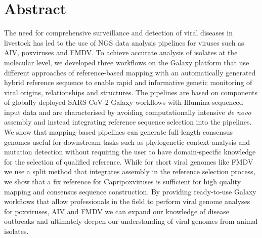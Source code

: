 \chapter*{Abstract}
The need for comprehensive surveillance and detection of viral diseases in livestock has led to the use of \ac{NGS} data analysis pipelines for viruses such as \ac{AIV}, poxviruses and \ac{FMDV}. To achieve accurate analysis of isolates at the molecular level, we developed three workflows on the Galaxy platform that use different approaches of reference-based mapping with an automatically generated hybrid reference sequence to enable rapid and informative genetic monitoring of viral origins, relationships and structures. The pipelines are based on components of globally deployed SARS-CoV-2 Galaxy workflows with Illumina-sequenced input data and are characterised by avoiding computationally intensive \textit{de novo} assembly and instead integrating reference sequence selection into the pipelines. We show that mapping-based pipelines can generate full-length consensus genomes useful for downstream tasks such as phylogenetic context analysis and mutation detection without requiring the user to have domain-specific knowledge for the selection of qualified reference. While for short viral genomes like FMDV we use a split method that integrates assembly in the reference selection process, we show that a fix reference for Capripoxviruses is sufficient for high quality mapping and consensus sequence construction. By providing ready-to-use Galaxy workflows that allow professionals in the field to perform viral genome analyses for poxviruses, AIV and FMDV we can expand our knowledge of disease outbreaks and ultimately deepen our understanding of viral genomes from animal isolates.